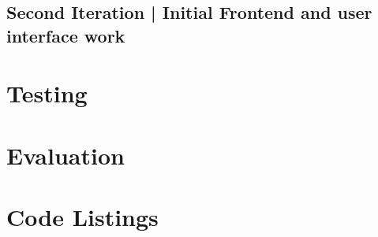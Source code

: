 \documentclass[11pt,a4paper]{article}
\begin{document}
\pagebreak
\subsection{Second Iteration | Initial Frontend and user interface work}


\pagebreak

\section{Testing}

\section{Evaluation}

\section{Code Listings}
\end{document}
